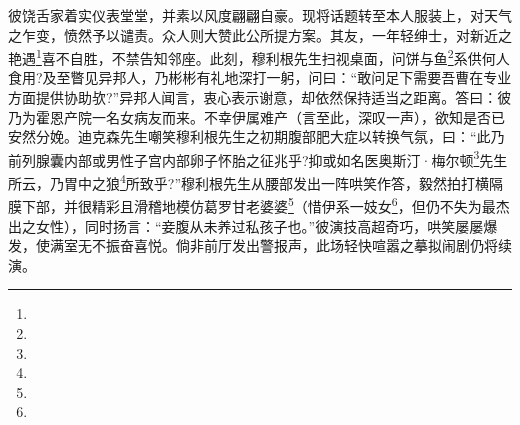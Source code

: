 \par 彼饶舌家着实仪表堂堂，并素以风度翩翩自豪。现将话题转至本人服装上，对天气之乍变，愤然予以谴责。众人则大赞此公所提方案。其友，一年轻绅士，对新近之艳遇\footnote{}喜不自胜，不禁告知邻座。此刻，穆利根先生扫视桌面，问饼与鱼\footnote{}系供何人食用?及至瞥见异邦人，乃彬彬有礼地深打一躬，问曰：“敢问足下需要吾曹在专业方面提供协助欤?”异邦人闻言，衷心表示谢意，却依然保持适当之距离。答曰：彼乃为霍恩产院一名女病友而来。不幸伊属难产（言至此，深叹一声），欲知是否已安然分娩。迪克森先生嘲笑穆利根先生之初期腹部肥大症以转换气氛，曰：“此乃前列腺囊内部或男性子宫内部卵子怀胎之征兆乎?抑或如名医奥斯汀·梅尔顿\footnote{}先生所云，乃胃中之狼\footnote{}所致乎?”穆利根先生从腰部发出一阵哄笑作答，毅然拍打横隔膜下部，并很精彩且滑稽地模仿葛罗甘老婆婆\footnote{}（惜伊系一妓女\footnote{}，但仍不失为最杰出之女性），同时扬言：“妾腹从未养过私孩子也。”彼演技高超奇巧，哄笑屡屡爆发，使满室无不振奋喜悦。倘非前厅发出警报声，此场轻快喧嚣之摹拟闹剧仍将续演。
